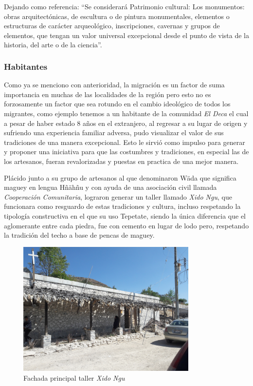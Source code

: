 Dejando como referencia: ``Se considerará Patrimonio cultural: Los monumentos: obras arquitectónicas, de escultura o de pintura monumentales, elementos o estructuras de carácter arqueológico, inscripciones, cavernas y grupos de elementos, que tengan un valor universal excepcional desde el punto de vista de la historia, del arte o de la ciencia''\citep{UNESCO1972}.


\subsubsection{Habitantes}
Como ya se menciono con anterioridad, la migración es un factor de suma importancia en muchas de las localidades de la región pero esto no es forzosamente un factor que sea rotundo en el cambio ideológico de todos los migrantes, como ejemplo tenemos a un habitante de la comunidad \emph{El Deca} el cual a pesar de haber estado 8 años en el extranjero, al regresar a su lugar de origen y sufriendo una experiencia familiar adversa, pudo visualizar el valor de sus tradiciones de una manera excepcional. Esto le sirvió como impulso para generar y proponer una iniciativa para que las costumbres y tradiciones, en especial las de los artesanos, fueran revalorizadas y puestas en practica de una mejor manera.

Plácido junto a su grupo de artesanos al que denominaron Wäda que significa maguey en lengua Hñähñu y con ayuda de una asociación civil llamada \emph{Cooperación Comunitaria}, lograron generar un taller llamado \emph{Xido Ngu}, que funcionara como resguardo de estas tradiciones y cultura, incluso respetando la tipología constructiva en el que su uso Tepetate, siendo la única diferencia que el aglomerante entre cada piedra, fue con cemento en lugar de lodo pero, respetando la tradición del techo a base de pencas de maguey.

\begin{figure}[ht]
    \center
    \includegraphics[width=0.8\textwidth]{../../imagenes/Xido_Ngu.jpg}
    \caption{Fachada principal taller \emph{Xido Ngu}}
\end{figure}

